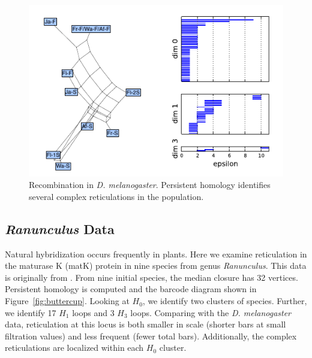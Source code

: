 \begin{figure}
\centering
\includegraphics[width=\columnwidth]{fig/complex_construction/kreitman.pdf}
\caption[Recombination in \emph{D. melanogaster}]{Recombination in \emph{D. melanogaster}. Persistent homology identifies several complex reticulations in the population.}
\label{fig:kreitman}
\end{figure}

\subsection{{\textit{Ranunculus}} Data}

Natural hybridization occurs frequently in plants.
Here we examine reticulation in the maturase K (matK) protein in nine species from genus \emph{Ranunculus}.
This data is originally from \cite{Huber:2001vv}.
From nine initial species, the median closure has 32 vertices.
Persistent homology is computed and the barcode diagram shown in Figure~\ref{fig:buttercup}.
Looking at $H_0$, we identify two clusters of species.
Further, we identify 17 $H_1$ loops and 3 $H_3$ loops.
Comparing with the \emph{D. melanogaster} data, reticulation at this locus is both smaller in scale (shorter bars at small filtration values) and less frequent (fewer total bars).
Additionally, the complex reticulations are localized within each $H_0$ cluster.

